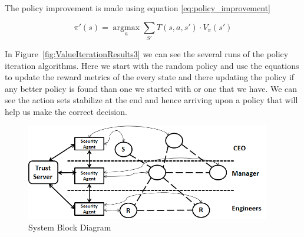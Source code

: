 The policy improvement is made using equation \ref{eq:policy_improvement}

\begin{equation} 
    \label{eq:policy_improvement}
    \pi'(s) = \operatorname*{argmax}_a \sum_{S'} T(s,a,s') \cdot V_\pi(s')
\end{equation}



In Figure~\ref{fig:ValueIterationResults3} we can see the several runs of the policy iteration
algorithms. Here we start with the random policy and use the equations to update
the reward metrics of the every state and there updating the policy if any
better policy is found than one we started with or one that we have. We can see
the action sets stabilize at the end and hence arriving upon a policy that will
help us make the correct decision.
\begin{figure}[h!]
    \label{fig:SystemBlockDiagram}
    \begin{center}
        \includegraphics[width=0.95\textwidth]{Figures/Planning_Figure_1.png}
        \caption{System Block Diagram}
    \end{center}
\end{figure}

